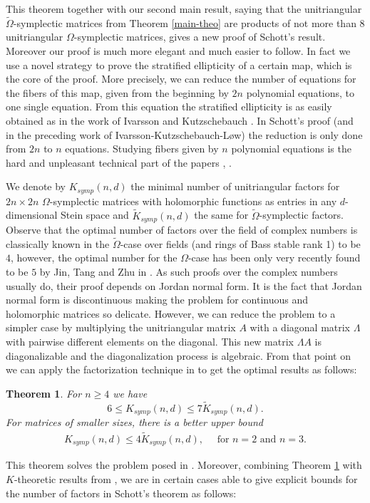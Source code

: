 \documentclass[10pt]{amsart}
\newtheorem{theo}{Theorem}[section]
\theoremstyle{remark}
\begin{document}
This theorem together  with our second main result, saying that the unitriangular $\tilde{\Omega}$-symplectic matrices from Theorem \ref{main-theo} are products of not more than 8 
unitriangular $\Omega$-symplectic matrices, gives a new proof of Schott's result.  Moreover our proof is much more elegant and much easier to follow. In fact we use a novel strategy to prove the stratified ellipticity of a certain map, which is the core of the proof. More precisely, we can reduce the number of equations for the fibers of this map, given from the beginning by $2n$ polynomial equations, to one single equation. From this equation
the stratified ellipticity is as easily obtained as in the work of Ivarsson and Kutzschebauch \cite{KI}. In Schott's proof (and in the preceding work of Ivarsson-Kutzschebauch-L\o w)
the reduction is only done from $2n$ to $n$ equations. Studying fibers given by $n$ polynomial equations is the  hard and unpleasant technical part of the papers \cite{IKL}, \cite{Scho}.



We denote by $K_{symp}(n,d)$ the minimal number
of unitriangular factors for $2n \times 2n$ $\Omega$-symplectic matrices with holomorphic functions as entries in any $d$-dimensional Stein space and
$\tilde K_{symp}(n,d)$ the same for  $\tilde \Omega $-symplectic  factors. Observe that the optimal number of factors over the field of complex numbers is classically known in the $\tilde\Omega$-case over fields (and rings of Bass stable rank 1)  to be $4$, however, the optimal number for the $\Omega$-case has been only very recently found to be $5$ by  Jin, Tang and Zhu  in \cite{JTZ}. As  such proofs over the complex numbers usually do, their proof depends on Jordan normal form. It is the fact that Jordan normal form is discontinuous making the problem for continuous and holomorphic matrices so delicate. However, we can reduce the problem to a simpler case by multiplying the unitriangular matrix $A$ with a diagonal matrix $\Lambda$ with pairwise different elements on the diagonal. This new matrix $\Lambda A$ is diagonalizable and the diagonalization process is algebraic. From that point on  we can apply the factorization technique in \cite{JTZ} to get the optimal results as follows:

\begin{theo}\label{main-theo2}
For $n \ge 4$ we have
$$6 \le K_{symp}(n,d) \le 7 \tilde K_{symp}(n,d).$$
For matrices of smaller sizes, there is a better upper bound
\begin{align} \label{K-Ktilde}
    K_{symp}(n,d) \le 4 \tilde K_{symp}(n,d), \quad \text{ for } n = 2 \text{ and } n=3.
\end{align}
\end{theo}
This theorem solves the problem posed in \cite[p. 6]{HKS}.
Moreover, combining Theorem \ref{main-theo2}
with $K$-theoretic results from \cite{VSS},\cite{HKS}
we are in certain cases able to give explicit bounds for the number of factors in Schott's theorem as follows:
\end{document}
